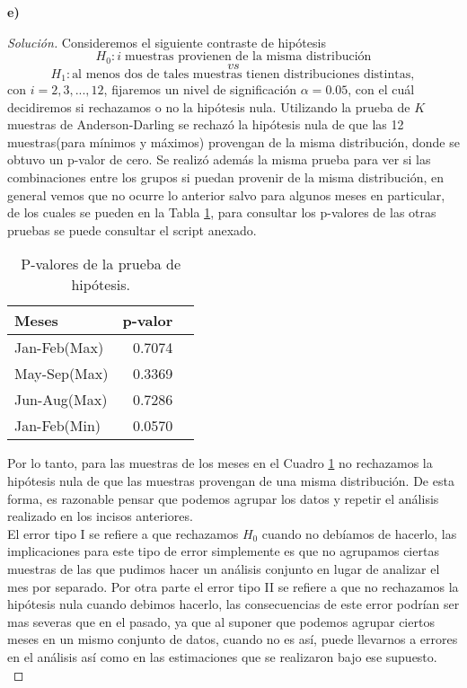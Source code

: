\documentclass[10.5pt,notitlepage]{article}
\newenvironment{solucion}
  {\begin{proof}[Solución]}
  {\end{proof}}
\theoremstyle{plain}
\begin{document}
\textbf{e)}
\begin{solucion}
Consideremos el siguiente contraste de hipótesis 
\[H_0:i\; \text{muestras provienen de la misma distribución}\]\[ vs\]\[H_1:\text{al menos dos de tales muestras
tienen distribuciones distintas},\] con $i=2,3,...,12$, fijaremos un nivel de significación $\alpha=0.05$, con el cuál decidiremos si rechazamos o no la hipótesis nula.
Utilizando la prueba de $K$ muestras de Anderson-Darling se rechazó la hipótesis nula de que las 12 muestras(para mínimos y máximos) provengan de la misma distribución, donde se obtuvo un p-valor de cero. Se realizó además la misma prueba para ver si las combinaciones entre los grupos si puedan provenir de la misma distribución, en general vemos que no ocurre lo anterior salvo para algunos meses en particular, de los cuales se pueden en la Tabla \ref{tab:V1}, para consultar los p-valores de las otras pruebas se puede consultar el script anexado.
\begin{table}[H]
        \centering
        \begin{tabular}{@{}l@{\hskip 0.3in}r@{\hskip 0.3in}r@{}}
        \toprule
        Meses &  p-valor\\
        \midrule          
        Jan-Feb(Max)&        0.7074\\
        May-Sep(Max)&        0.3369\\
        Jun-Aug(Max)&        0.7286\\
       Jan-Feb(Min)&        0.0570\\
        \end{tabular}
        \caption{P-valores de la prueba de hipótesis.}
        \label{tab:V1}
\end{table}

Por lo tanto, para las muestras de los meses en el Cuadro \ref{tab:V1} no rechazamos la hipótesis nula de que las muestras provengan de una misma distribución. De esta forma, es razonable pensar que podemos agrupar los datos y repetir el análisis realizado en los incisos anteriores.\\
El error tipo I se refiere a que rechazamos $H_0$ cuando no debíamos de hacerlo, las implicaciones para este tipo de error simplemente es que no agrupamos ciertas muestras de las que pudimos hacer un análisis conjunto en lugar de analizar el mes por separado. Por otra parte el error tipo II se refiere a que no rechazamos la hipótesis nula cuando debimos hacerlo, las consecuencias de este error podrían ser mas severas que en el pasado, ya que al suponer que podemos agrupar ciertos meses en un mismo conjunto de datos, cuando no es así, puede llevarnos a errores en el análisis así como en las estimaciones que se realizaron bajo ese supuesto.\\


\end{solucion}
\end{document}
